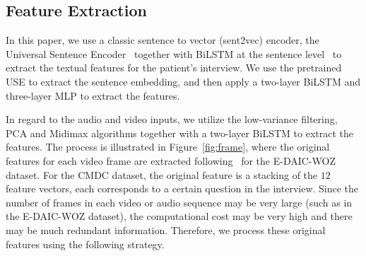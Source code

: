 \documentclass{article}
\begin{document}
\subsection{Feature Extraction} 
In this paper, we use a classic sentence to vector (sent2vec) encoder, the Universal Sentence Encoder~\cite{USE} together with BiLSTM at the sentence level~\cite{AU2} to extract the textual features for the patient's interview.
We use the pretrained USE to extract the sentence embedding, and then apply a two-layer BiLSTM and three-layer MLP to extract the features.


In regard to the audio and video inputs, we utilize the low-variance filtering, PCA and Midimax algorithms together with a two-layer BiLSTM to extract the features.
The process is illustrated in Figure~\ref{fig:frame}, where the original features for each video frame are extracted following~\cite{AVEC2019,DAIC} for the E-DAIC-WOZ dataset.
For the CMDC dataset, the original feature is a stacking of the $12$ feature vectors, each corresponds to a certain question in the interview.
Since the number of frames in each video or audio sequence may be very large (such as in the E-DAIC-WOZ dataset), the computational cost may be very high and there may be much redundant information. Therefore, we process these original features using the following strategy.
\end{document}
